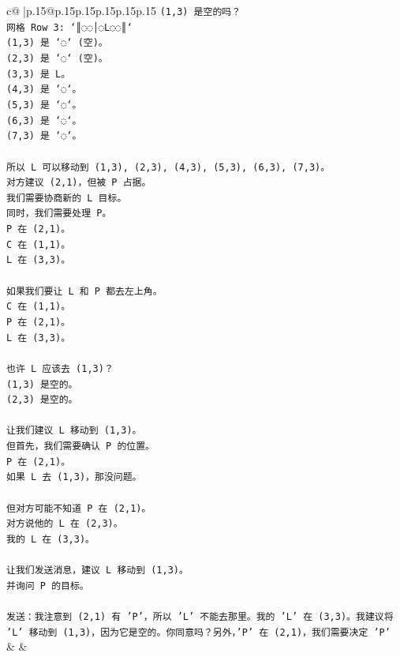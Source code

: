 \documentclass{article}
\begin{document}
{\begin{supertabular}{c@{$\;$}|p{.15\linewidth}@{}p{.15\linewidth}p{.15\linewidth}p{.15\linewidth}p{.15\linewidth}p{.15\linewidth}}
{{{\texttt{(1,3) 是空的吗？} \\
\texttt{网格 Row 3: `║◌◌│◌L◌◌║`} \\
\texttt{(1,3) 是 `◌` (空)。} \\
\texttt{(2,3) 是 `◌` (空)。} \\
\texttt{(3,3) 是 L。} \\
\texttt{(4,3) 是 `◌`。} \\
\texttt{(5,3) 是 `◌`。} \\
\texttt{(6,3) 是 `◌`。} \\
\texttt{(7,3) 是 `◌`。} \\
\\ 
\texttt{所以 L 可以移动到 (1,3), (2,3), (4,3), (5,3), (6,3), (7,3)。} \\
\texttt{对方建议 (2,1)，但被 P 占据。} \\
\texttt{我们需要协商新的 L 目标。} \\
\texttt{同时，我们需要处理 P。} \\
\texttt{P 在 (2,1)。} \\
\texttt{C 在 (1,1)。} \\
\texttt{L 在 (3,3)。} \\
\\ 
\texttt{如果我们要让 L 和 P 都去左上角。} \\
\texttt{C 在 (1,1)。} \\
\texttt{P 在 (2,1)。} \\
\texttt{L 在 (3,3)。} \\
\\ 
\texttt{也许 L 应该去 (1,3)？} \\
\texttt{(1,3) 是空的。} \\
\texttt{(2,3) 是空的。} \\
\\ 
\texttt{让我们建议 L 移动到 (1,3)。} \\
\texttt{但首先，我们需要确认 P 的位置。} \\
\texttt{P 在 (2,1)。} \\
\texttt{如果 L 去 (1,3)，那没问题。} \\
\\ 
\texttt{但对方可能不知道 P 在 (2,1)。} \\
\texttt{对方说他的 L 在 (2,3)。} \\
\texttt{我的 L 在 (3,3)。} \\
\\ 
\texttt{让我们发送消息，建议 L 移动到 (1,3)。} \\
\texttt{并询问 P 的目标。} \\
\\ 
\texttt{发送：我注意到 (2,1) 有 'P'，所以 'L' 不能去那里。我的 'L' 在 (3,3)。我建议将 'L' 移动到 (1,3)，因为它是空的。你同意吗？另外，'P' 在 (2,1)，我们需要决定 'P'} \\
            }
        }
    }
    & & \\ \\


\end{supertabular}}
\end{document}
